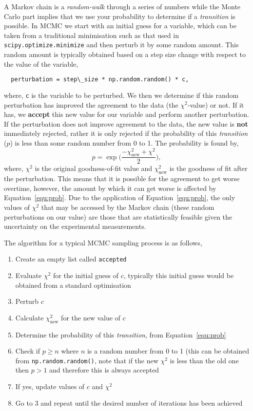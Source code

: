 \documentclass[a4paper]{article}
\begin{document}
A Markov chain is a \emph{random-walk} through a series of numbers while the Monte Carlo part implies that we use your probability to determine if a \emph{transition} is possible.
In MCMC we start with an initial guess for a variable, which can be taken from a traditional minimisation such as that used in \texttt{scipy.optimize.minimize} and then perturb it by some random amount. 
This random amount is typically obtained based on a step size change with respect to the value of the variable, 
%
\begin{lstlisting}
  perturbation = step\_size * np.random.random() * c,
\end{lstlisting}
%
where, \texttt{c} is the variable to be perturbed.
We then we determine if this random perturbation has improved the agreement to the data (the $\chi^2$-value) or not. 
If it has, we \textbf{accept} this new value for our variable and perform another perturbation. 
If the perturbation does not improve agreement to the data, the new value is \textbf{not} immediately rejected, rather it is only rejected if the probability of this \emph{transition} ($p$) is less than some random number from 0 to 1. 
The probability is found by, 
%
\begin{equation}
  p = \exp{\bigg(\frac{-\chi^2_{\text{new}} + \chi^2}{2}\bigg)},
  \label{equ:prob}
\end{equation}
%
where, $\chi^2$ is the original goodness-of-fit value and $\chi^2_{\text{new}}$ is the goodness of fit after the perturbation. 
This means that it is possible for the agreement to get worse overtime, however, the amount by which it can get worse is affected by Equation~\ref{equ:prob}. 
Due to the application of Equation~\ref{equ:prob}, the only values of $\chi^2$ that may be accessed by the Markov chain (these random perturbations on our value) are those that are statistically feasible given the uncertainty on the experimental measurements. 

The algorithm for a typical MCMC sampling process is as follows, 
\begin{enumerate}
  \item {Create an empty list called \texttt{accepted}}
  \item {Evaluate $\chi^2$ for the initial guess of $c$, typically this initial guess would be obtained from a standard optimisation}
  \item {Perturb $c$}
  \item {Calculate $\chi^2_{\text{new}}$ for the new value of $c$}
  \item {Determine the probability of this \emph{transition}, from Equation~\ref{equ:prob}}
  \item {Check if $p \ge n$ where $n$ is a random number from 0 to 1 (this can be obtained from \texttt{np.random.random()}, note that if the new $\chi^2$ is less than the old one then $p > 1$ and therefore this is always accepted}
  \item {If yes, update values of $c$ and $\chi^2$}
  \item {Go to 3 and repeat until the desired number of iterations has been achieved}
\end{enumerate}
\end{document}

